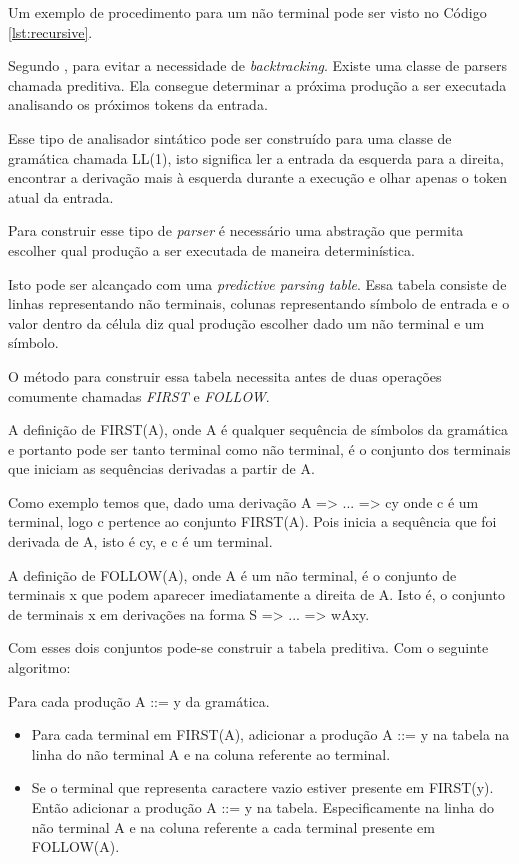 Um exemplo de procedimento para um não terminal pode ser visto no Código \ref{lst:recursive}.

Segundo , para evitar a necessidade de \textit{backtracking}. 
Existe uma classe de parsers chamada preditiva. Ela consegue determinar a próxima produção 
a ser executada analisando os próximos tokens da entrada.

Esse tipo de analisador sintático pode ser construído para uma classe de gramática chamada LL(1), isto significa
ler a entrada da esquerda para a direita, encontrar a derivação mais à esquerda durante a execução e olhar 
apenas o token atual da entrada.

Para construir esse tipo de \textit{parser} é necessário uma abstração que permita escolher qual produção
a ser executada de maneira determinística.

Isto pode ser alcançado com uma \textit{predictive parsing table}. Essa tabela consiste
de linhas representando não terminais, colunas representando símbolo de entrada e o valor
dentro da célula diz qual produção escolher dado um não terminal e um símbolo.

O método para construir essa tabela necessita antes de duas operações comumente chamadas \textit{FIRST} e 
\textit{FOLLOW}.

A definição de FIRST(A), onde A é qualquer sequência de símbolos da gramática e portanto pode 
ser tanto terminal como não terminal, é o conjunto dos terminais que iniciam as 
sequências derivadas a partir de A. 

Como exemplo temos que, dado uma derivação A => ... => cy onde c é um terminal, 
logo c pertence ao conjunto FIRST(A). Pois inicia a sequência que foi derivada de A, isto é cy, 
e c é um terminal.

A definição de FOLLOW(A), onde A é um não terminal, é o conjunto de terminais x que podem aparecer imediatamente
a direita de A. Isto é, o conjunto de terminais x em derivações na forma S => ... => wAxy.

Com esses dois conjuntos pode-se construir a tabela preditiva. Com o seguinte algoritmo:

Para cada produção A ::= y da gramática.

\begin{itemize}
    \item Para cada terminal em FIRST(A), adicionar a produção A ::= y na tabela na linha do não terminal A e na coluna
    referente ao terminal.
    \item Se o terminal que representa caractere vazio estiver presente em FIRST(y). Então 
    adicionar a produção A ::= y na tabela. Especificamente na linha do não terminal A e 
    na coluna referente a cada terminal presente em FOLLOW(A).
\end{itemize}


